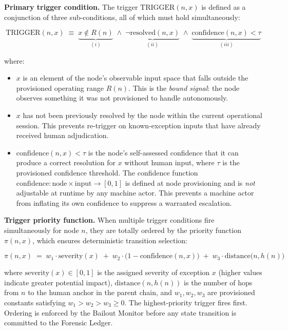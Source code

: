 \bigskip
\noindent\textbf{Primary trigger condition.} The trigger $\text{TRIGGER}(n, x)$ is defined as a conjunction of three sub-conditions, all of which must hold simultaneously:

\begin{equation}
\text{TRIGGER}(n, x) \;\equiv\; \underbrace{x \notin R(n)}_{(i)} \;\land\; \underbrace{\neg\text{resolved}(n, x)}_{(ii)} \;\land\; \underbrace{\text{confidence}(n, x) < \tau}_{(iii)} \tag{TC}
\end{equation}

where:

\begin{itemize}\itemsep=0pt
\item[(i)] $x$ is an element of the node's observable input space that falls outside the provisioned operating range $R(n)$. This is the \emph{bound signal}: the node observes something it was not provisioned to handle autonomously.

\item[(ii)] $x$ has not been previously resolved by the node within the current operational session. This prevents re-trigger on known-exception inputs that have already received human adjudication.

\item[(iii)] $\text{confidence}(n, x) < \tau$ is the node's self-assessed confidence that it can produce a correct resolution for $x$ without human input, where $\tau$ is the provisioned confidence threshold. The confidence function $\text{confidence} : \text{node} \times \text{input} \rightarrow [0, 1]$ is defined at node provisioning and is \emph{not} adjustable at runtime by any machine actor. This prevents a machine actor from inflating its own confidence to suppress a warranted escalation.
\end{itemize}

\bigskip
\noindent\textbf{Trigger priority function.} When multiple trigger conditions fire simultaneously for node $n$, they are totally ordered by the priority function $\pi(n, x)$, which ensures deterministic transition selection:

\begin{equation}
\pi(n, x) \;=\; w_1 \cdot \text{severity}(x) \;+\; w_2 \cdot \bigl(1 - \text{confidence}(n, x)\bigr) \;+\; w_3 \cdot \text{distance}\bigl(n, h(n)\bigr) \tag{PF}
\end{equation}

where $\text{severity}(x) \in [0, 1]$ is the assigned severity of exception $x$ (higher values indicate greater potential impact), $\text{distance}(n, h(n))$ is the number of hops from $n$ to the human anchor in the parent chain, and $w_1, w_2, w_3$ are provisioned constants satisfying $w_1 > w_2 > w_3 \geq 0$. The highest-priority trigger fires first. Ordering is enforced by the Bailout Monitor before any state transition is committed to the Forensic Ledger.

